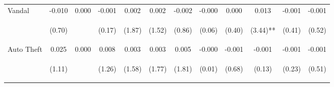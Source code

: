 \begin{tabular}{lccccccccccc}
\noalign{\smallskip}Vandal & -0.010 & 0.000 & -0.001 & 0.002 & 0.002 & -0.002 & -0.000 & 0.000 & 0.013 & -0.001 & -0.001\\
 & \begin{footnotesize}(0.70)\end{footnotesize} & \begin{footnotesize}\end{footnotesize} & \begin{footnotesize}(0.17)\end{footnotesize} & \begin{footnotesize}(1.87)\end{footnotesize} & \begin{footnotesize}(1.52)\end{footnotesize} & \begin{footnotesize}(0.86)\end{footnotesize} & \begin{footnotesize}(0.06)\end{footnotesize} & \begin{footnotesize}(0.40)\end{footnotesize} & \begin{footnotesize}(3.44)**\end{footnotesize} & \begin{footnotesize}(0.41)\end{footnotesize} & \begin{footnotesize}(0.52)\end{footnotesize}\\
\noalign{\smallskip}Auto Theft & 0.025 & 0.000 & 0.008 & 0.003 & 0.003 & 0.005 & -0.000 & -0.001 & -0.001 & -0.001 & -0.001\\
 & \begin{footnotesize}(1.11)\end{footnotesize} & \begin{footnotesize}\end{footnotesize} & \begin{footnotesize}(1.26)\end{footnotesize} & \begin{footnotesize}(1.58)\end{footnotesize} & \begin{footnotesize}(1.77)\end{footnotesize} & \begin{footnotesize}(1.81)\end{footnotesize} & \begin{footnotesize}(0.01)\end{footnotesize} & \begin{footnotesize}(0.68)\end{footnotesize} & \begin{footnotesize}(0.13)\end{footnotesize} & \begin{footnotesize}(0.23)\end{footnotesize} & \begin{footnotesize}(0.51)\end{footnotesize}\\

\end{tabular}
